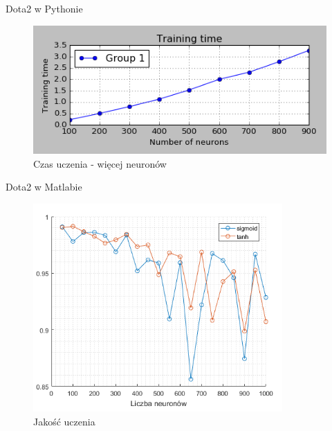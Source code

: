 \documentclass{beamer}
\begin{document}
\begin{frame}{Dota2 w Pythonie}
\begin{figure}[H]
\includegraphics[width=\textwidth]{wyniki_dota2_python_training_time_2.png}
\caption{Czas uczenia - więcej neuronów}
\end{figure}

\end{frame}


\begin{frame}{Dota2 w Matlabie}
\begin{figure}[H]
\centering
\includegraphics[width=0.85\textwidth]{dota_liczba_neuronow.png}
\caption{Jakość uczenia}
\end{figure}
\end{frame}
\end{document}
